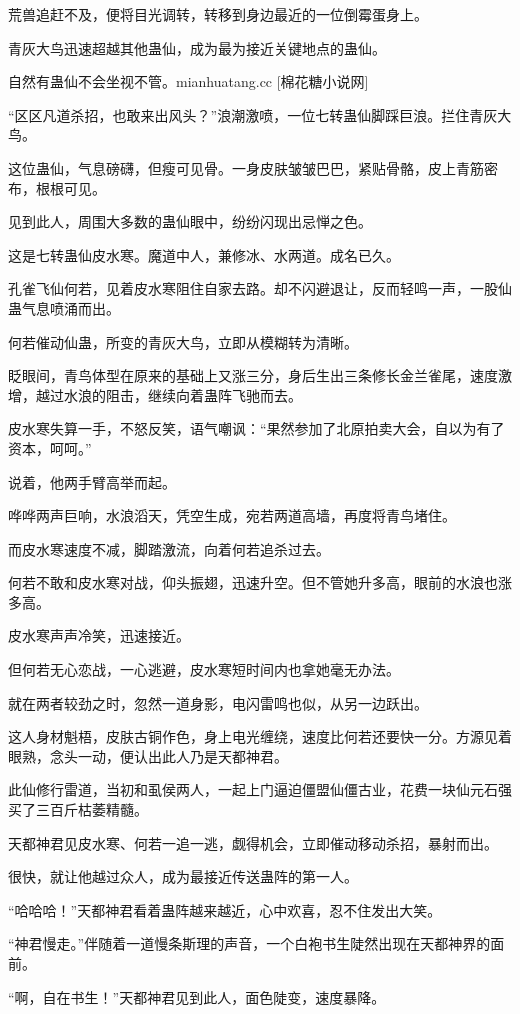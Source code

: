 \begin{this_body}
荒兽追赶不及，便将目光调转，转移到身边最近的一位倒霉蛋身上。

青灰大鸟迅速超越其他蛊仙，成为最为接近关键地点的蛊仙。

自然有蛊仙不会坐视不管。mianhuatang.cc [棉花糖小说网]

“区区凡道杀招，也敢来出风头？”浪潮激喷，一位七转蛊仙脚踩巨浪。拦住青灰大鸟。

这位蛊仙，气息磅礴，但瘦可见骨。一身皮肤皱皱巴巴，紧贴骨骼，皮上青筋密布，根根可见。

见到此人，周围大多数的蛊仙眼中，纷纷闪现出忌惮之色。

这是七转蛊仙皮水寒。魔道中人，兼修冰、水两道。成名已久。

孔雀飞仙何若，见着皮水寒阻住自家去路。却不闪避退让，反而轻鸣一声，一股仙蛊气息喷涌而出。

何若催动仙蛊，所变的青灰大鸟，立即从模糊转为清晰。

眨眼间，青鸟体型在原来的基础上又涨三分，身后生出三条修长金兰雀尾，速度激增，越过水浪的阻击，继续向着蛊阵飞驰而去。

皮水寒失算一手，不怒反笑，语气嘲讽：“果然参加了北原拍卖大会，自以为有了资本，呵呵。”

说着，他两手臂高举而起。

哗哗两声巨响，水浪滔天，凭空生成，宛若两道高墙，再度将青鸟堵住。

而皮水寒速度不减，脚踏激流，向着何若追杀过去。

何若不敢和皮水寒对战，仰头振翅，迅速升空。但不管她升多高，眼前的水浪也涨多高。

皮水寒声声冷笑，迅速接近。

但何若无心恋战，一心逃避，皮水寒短时间内也拿她毫无办法。

就在两者较劲之时，忽然一道身影，电闪雷鸣也似，从另一边跃出。

这人身材魁梧，皮肤古铜作色，身上电光缠绕，速度比何若还要快一分。方源见着眼熟，念头一动，便认出此人乃是天都神君。

此仙修行雷道，当初和虱侯两人，一起上门逼迫僵盟仙僵古业，花费一块仙元石强买了三百斤枯萎精髓。

天都神君见皮水寒、何若一追一逃，觑得机会，立即催动移动杀招，暴射而出。

很快，就让他越过众人，成为最接近传送蛊阵的第一人。

“哈哈哈！”天都神君看着蛊阵越来越近，心中欢喜，忍不住发出大笑。

“神君慢走。”伴随着一道慢条斯理的声音，一个白袍书生陡然出现在天都神界的面前。

“啊，自在书生！”天都神君见到此人，面色陡变，速度暴降。


\end{this_body}
